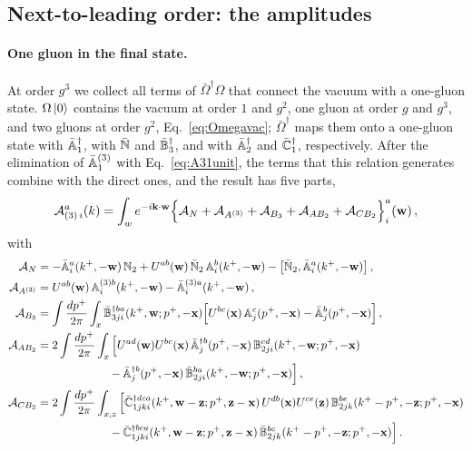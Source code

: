 \subsection{Next-to-leading order: the amplitudes}\label{sec:NLOamplitudes}

\paragraph{One gluon in the final state.} At order $g^3$ we collect all terms of $\bar\Omega^\dagger\Omega$ that connect the vacuum with a one-gluon state. $\Omega\ket0$ contains the vacuum at order $1$ and $g^2$, one gluon at order $g$ and $g^3$, and two gluons at order $g^2$, Eq.~\eqref{eq:Omegavac}; $\bar\Omega^\dagger$ maps them onto a one-gluon state with $\bar{\mathbb{A}}^\dagger_1$, with $\bar{\mathbb{N}}$ and $\bar{\mathbb{B}}_3^\dagger$, and with $\bar{\mathbb{A}}_2^\dagger$ and $\bar{\mathbb{C}}_1^\dagger$, respectively. After the elimination of $\bar{\mathbb{A}}^{(3)}_1$ with Eq.~\eqref{eq:A31unit}, the terms that this relation generates combine with the direct ones, and the result has five parts,
\begin{align}\label{eq:A3amp}
\mathcal A^a_{(3)\,i}(k)=\int_w e^{-i\mathbf{k}\cdot\mathbf{w}}\Big\{\mathcal A_{N}+\mathcal A_{A^{(3)}}+\mathcal A_{B_3}+\mathcal A_{AB_2}+\mathcal A_{CB_2}\Big\}^a_i(\mathbf{w})\,,
\end{align}
with
\begin{align}\label{eq:A3parts}
\mathcal A_{N}&=-\bar{\mathbb{A}}^a_i(k^+,-\mathbf{w})\,\mathbb{N}_2+U^{ab}(\mathbf{w})\,\bar{\mathbb{N}}_2\,\mathbb{A}^b_i(k^+,-\mathbf{w})-\big[\bar{\mathbb{N}}_2,\bar{\mathbb{A}}^a_i(k^+,-\mathbf{w})\big]\,,
\notag\\
\mathcal A_{A^{(3)}}&=U^{ab}(\mathbf{w})\,\mathbb{A}^{(3)b}_i(k^+,-\mathbf{w})-\bar{\mathbb{A}}^{(3)a}_i(k^+,-\mathbf{w})\,,
\notag\\
\mathcal A_{B_3}&=\int\frac{dp^+}{2\pi}\int_x\bar{\mathbb{B}}^{\dagger ba}_{3ji}(k^+,\mathbf{w};p^+,-\mathbf{x})\Big[U^{bc}(\mathbf{x})\,\mathbb{A}^c_j(p^+,-\mathbf{x})-\bar{\mathbb{A}}^b_j(p^+,-\mathbf{x})\Big]\,,
\notag\\
\mathcal A_{AB_2}&=2\int\frac{dp^+}{2\pi}\int_x\Big[U^{ad}(\mathbf{w})U^{bc}(\mathbf{x})\,\bar{\mathbb{A}}^{\dagger b}_j(p^+,-\mathbf{x})\,\mathbb{B}^{cd}_{2ji}(k^+,-\mathbf{w};p^+,-\mathbf{x})
\notag\\&\hspace{2.2cm}
-\bar{\mathbb{A}}^{\dagger b}_j(p^+,-\mathbf{x})\,\bar{\mathbb{B}}^{ba}_{2ji}(k^+,-\mathbf{w};p^+,-\mathbf{x})\Big]\,,
\notag\\
\mathcal A_{CB_2}&=2\int\frac{dp^+}{2\pi}\int_{x,z}\Big[\bar{\mathbb{C}}^{\dagger dca}_{1jki}(k^+,\mathbf{w}-\mathbf{z};p^+,\mathbf{z}-\mathbf{x})\,U^{db}(\mathbf{x})U^{ce}(\mathbf{z})\,\mathbb{B}^{be}_{2jk}(k^+-p^+,-\mathbf{z};p^+,-\mathbf{x})
\notag\\&\hspace{2.2cm}
-\bar{\mathbb{C}}^{\dagger bca}_{1jki}(k^+,\mathbf{w}-\mathbf{z};p^+,\mathbf{z}-\mathbf{x})\,\bar{\mathbb{B}}^{bc}_{2jk}(k^+-p^+,-\mathbf{z};p^+,-\mathbf{x})\Big]\,.
\end{align}
